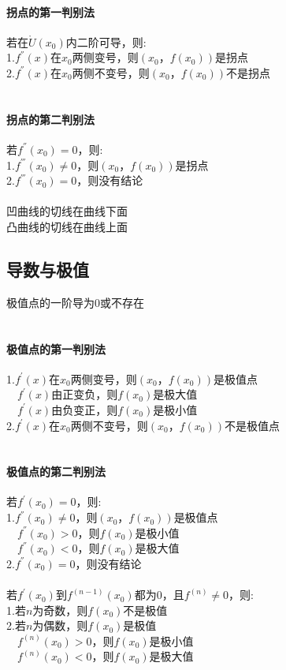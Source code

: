 \documentclass{article}
\begin{document}
\begin{flushleft}
	\paragraph{拐点的第一判别法}
	若在$\mathring{U}(x_0)$内二阶可导，则:\\
	1.$f^{''}(x)$在$x_0$两侧变号，则$(x_0，f(x_0))$是拐点\\
	2.$f^{''}(x)$在$x_0$两侧不变号，则$(x_0，f(x_0))$不是拐点\\
	~\\
	\paragraph{拐点的第二判别法}
	若$f^{''}(x_0)=0$，则:\\
	1.$f^{'''}(x_0)\neq 0$，则$(x_0，f(x_0))$是拐点\\
	2.$f^{'''}(x_0)=0$，则没有结论\\
	~\\
	凹曲线的切线在曲线下面\\
	凸曲线的切线在曲线上面\\
	
	\subsection{导数与极值}
	
	极值点的一阶导为0或不存在\\
	~\\
	\paragraph{极值点的第一判别法}
	1.$f^{'}(x)$在$x_0$两侧变号，则$(x_0，f(x_0))$是极值点\\
	\ \ $f^{'}(x)$由正变负，则$f(x_0)$是极大值\\
	\ \ $f^{'}(x)$由负变正，则$f(x_0)$是极小值\\
	2.$f^{'}(x)$在$x_0$两侧不变号，则$(x_0，f(x_0))$不是极值点\\
	~\\
	\paragraph{极值点的第二判别法}
	若$f^{'}(x_0)=0$，则:\\
	1.$f^{''}(x_0)\neq 0$，则$(x_0，f(x_0))$是极值点\\
	\ \ $f^{''}(x_0)>0$，则$f(x_0)$是极小值\\
	\ \ $f^{''}(x_0)<0$，则$f(x_0)$是极大值\\
	2.$f^{''}(x_0)=0$，则没有结论\\
	~\\
	若$f^{'}(x_0)$到$f^{(n-1)}(x_0)$都为0，且$f^{(n)}\neq 0$，则:\\
	1.若$n$为奇数，则$f(x_0)$不是极值\\
	2.若$n$为偶数，则$f(x_0)$是极值\\
	\ \ $f^{(n)}(x_0)>0$，则$f(x_0)$是极小值\\
	\ \ $f^{(n)}(x_0)<0$，则$f(x_0)$是极大值\\
	

\end{flushleft}
\end{document}
